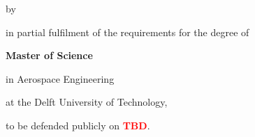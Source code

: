 \begin{titlepage}

\begin{center}


\vspace*{2\bigskipamount}

{\makeatletter
\titlestyle\color{tudelft-cyan}\Huge\@title
\makeatother}

{\makeatletter
\ifx\@subtitle\undefined\else
    \bigskip
    \titlefont\titleshape\LARGE\@subtitle
\fi
\makeatother}

\bigskip
\bigskip

by

\bigskip
\bigskip

{\makeatletter
\titlefont\Large\bfseries\@author
\makeatother}

\vfill

in partial fulfilment of the requirements for the degree of

\bigskip
\bigskip

{\bfseries Master of Science}

in Aerospace Engineering

\bigskip
\bigskip

at the Delft University of Technology,

to be defended publicly on \textbf{\textcolor{red}{TBD}}.



\end{center}
\end{titlepage}
